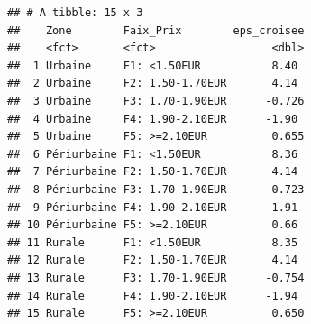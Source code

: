 \documentclass[
]{article}
\begin{document}
\begin{verbatim}
## # A tibble: 15 x 3
##    Zone        Faix_Prix        eps_croisee
##    <fct>       <fct>                  <dbl>
##  1 Urbaine     F1: <1.50EUR           8.40 
##  2 Urbaine     F2: 1.50-1.70EUR       4.14 
##  3 Urbaine     F3: 1.70-1.90EUR      -0.726
##  4 Urbaine     F4: 1.90-2.10EUR      -1.90 
##  5 Urbaine     F5: >=2.10EUR          0.655
##  6 Périurbaine F1: <1.50EUR           8.36 
##  7 Périurbaine F2: 1.50-1.70EUR       4.14 
##  8 Périurbaine F3: 1.70-1.90EUR      -0.723
##  9 Périurbaine F4: 1.90-2.10EUR      -1.91 
## 10 Périurbaine F5: >=2.10EUR          0.66 
## 11 Rurale      F1: <1.50EUR           8.35 
## 12 Rurale      F2: 1.50-1.70EUR       4.14 
## 13 Rurale      F3: 1.70-1.90EUR      -0.754
## 14 Rurale      F4: 1.90-2.10EUR      -1.94 
## 15 Rurale      F5: >=2.10EUR          0.650
\end{verbatim}
\end{document}
